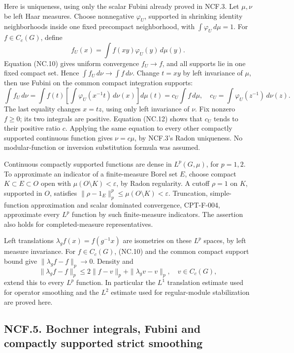 \documentclass[
  11pt,
]{article}
\begin{document}
Here is uniqueness, using only the scalar Fubini already proved in
NCF.3. Let \(\mu,\nu\) be left Haar measures. Choose nonnegative
\(\varphi_U\), supported in shrinking identity neighborhoods inside one
fixed precompact neighborhood, with \(\int\varphi_U\,d\mu=1\). For
\(f\in C_c(G)\), define \[
 f_U(x)=\int f(xy)\varphi_U(y)\,d\mu(y).
\] Equation (NC.10) gives uniform convergence \(f_U\to f\), and all
supports lie in one fixed compact set. Hence
\(\int f_U\,d\nu\to\int f\,d\nu\). Change \(t=xy\) by left invariance of
\(\mu\), then use Fubini on the common compact integration supports: \[
 \int f_U\,d\nu
 =\int f(t)\left[\int\varphi_U(x^{-1}t)\,d\nu(x)\right]d\mu(t)
 =c_U\int f\,d\mu,
 \quad c_U=\int\varphi_U(z^{-1})\,d\nu(z).               \tag{NC.12}
\] The last equality changes \(x=tz\), using only left invariance of
\(\nu\). Fix nonzero \(f\geq0\); its two integrals are positive.
Equation (NC.12) shows that \(c_U\) tends to their positive ratio \(c\).
Applying the same equation to every other compactly supported continuous
function gives \(\nu=c\mu\), by NCF.3's Radon uniqueness. No
modular-function or inversion substitution formula was assumed.

Continuous compactly supported functions are dense in \(L^p(G,\mu)\),
for \(p=1,2\). To approximate an indicator of a finite-measure Borel set
\(E\), choose compact \(K\subset E\subset O\) open with
\(\mu(O\setminus K)<\varepsilon\), by Radon regularity. A cutoff
\(\rho=1\) on \(K\), supported in \(O\), satisfies
\(\|\rho-1_E\|_p^p\leq\mu(O\setminus K)<\varepsilon\). Truncation,
simple-function approximation and scalar dominated convergence,
CPT-F-004, approximate every \(L^p\) function by such finite-measure
indicators. The assertion also holds for completed-measure
representatives.

Left translations \(\lambda_gf(x)=f(g^{-1}x)\) are isometries on these
\(L^p\) spaces, by left measure invariance. For \(f\in C_c(G)\), (NC.10)
and the common compact support bound give \(\|\lambda_gf-f\|_p\to0\).
Density and \[
 \|\lambda_gf-f\|_p
 \leq2\|f-v\|_p+\|\lambda_gv-v\|_p,\quad v\in C_c(G),
                                                               \tag{NC.13}
\] extend this to every \(L^p\) function. In particular the \(L^1\)
translation estimate used for operator smoothing and the \(L^2\)
estimate used for regular-module stabilization are proved here.

\subsection{NCF.5. Bochner integrals, Fubini and compactly supported
strict
smoothing}\label{ncf.5.-bochner-integrals-fubini-and-compactly-supported-strict-smoothing}
\end{document}

